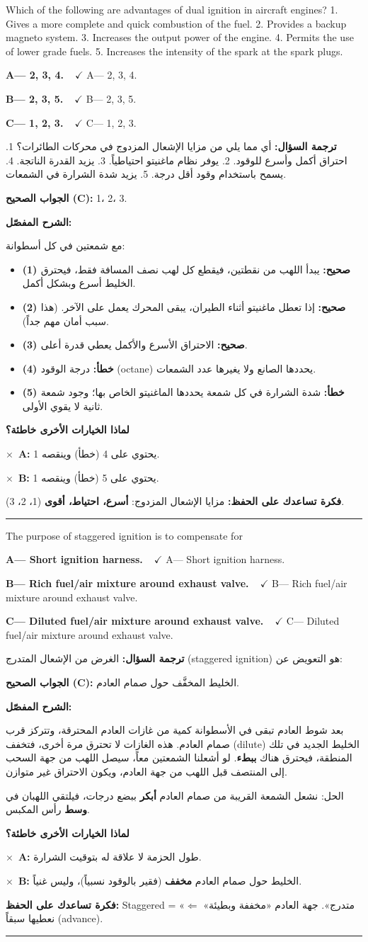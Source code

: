 \documentclass[11pt,a4paper]{article}
\newcommand{\en}[1]{\textenglish{#1}}
\newcommand{\correctletter}{}
\newcommand{\opt}[2]{%
  \ifdefstring{\correctletter}{#1}%
    {\textcolor{ansgreen}{\textbf{#1— #2\ \ $\checkmark$}}}%
    {#1— #2}\par}
\newcommand{\Q}[6]{%
  \renewcommand{\correctletter}{#6}%
  \par\bigskip
  \phantomsection\label{q#1}%
  \begin{tcolorbox}[enhanced,breakable,colback=qback,colframe=qframe,
      arc=2mm,boxrule=0.8pt,fonttitle=\bfseries,
      title={\en{Question #1}}]
    \begin{english}
      #2\par\smallskip
      \opt{A}{#3}\opt{B}{#4}\opt{C}{#5}
    \end{english}
  \end{tcolorbox}}
\newcommand{\tr}[1]{\textbf{\textcolor{qframe}{ترجمة السؤال:}} #1\par}
\newcommand{\ans}[2]{%
  \begin{tcolorbox}[colback=ansback,colframe=ansgreen,boxrule=0.6pt,arc=1.5mm,
      left=4pt,right=4pt,top=2pt,bottom=2pt]
    \textbf{\textcolor{ansgreen}{الجواب الصحيح (\en{#1}):}} #2
  \end{tcolorbox}}
\newcommand{\sharh}[1]{\textbf{\textcolor{conceptc}{الشرح المفصّل:}}\par #1\par}
\newcommand{\nohead}{\textbf{\textcolor{wrongc}{لماذا الخيارات الأخرى خاطئة؟}}\par}
\newcommand{\no}[2]{\hspace*{1em}\textcolor{wrongc}{$\times$}\ \textbf{\en{#1}:} #2\par}
\newcommand{\tip}[1]{%
  \begin{tcolorbox}[colback=tipback,colframe=tipframe,boxrule=0.5pt,arc=1.5mm,
      left=4pt,right=4pt,top=2pt,bottom=2pt]
    \textbf{فكرة تساعدك على الحفظ:} #1
  \end{tcolorbox}}
\newcommand{\qsep}{\par\medskip\noindent\textcolor{qframe!40}{\rule{\linewidth}{0.4pt}}\par}
\begin{document}
\Q{8600}{Which of the following are advantages of dual ignition in aircraft engines? 1. Gives a more complete and quick combustion of the fuel. 2. Provides a backup magneto system. 3. Increases the output power of the engine. 4. Permits the use of lower grade fuels. 5. Increases the intensity of the spark at the spark plugs.}
{2, 3, 4.}
{2, 3, 5.}
{1, 2, 3.}{C}
\tr{أي مما يلي من مزايا الإشعال المزدوج في محركات الطائرات؟ 1. احتراق أكمل وأسرع للوقود. 2. يوفر نظام ماغنيتو احتياطياً. 3. يزيد القدرة الناتجة. 4. يسمح باستخدام وقود أقل درجة. 5. يزيد شدة الشرارة في الشمعات.}
\ans{C}{1، 2، 3.}
\sharh{مع شمعتين في كل أسطوانة:
\begin{itemize}
  \item \textbf{(1) صحيح:} يبدأ اللهب من نقطتين، فيقطع كل لهب نصف المسافة فقط، فيحترق الخليط أسرع وبشكل أكمل.
  \item \textbf{(2) صحيح:} إذا تعطل ماغنيتو أثناء الطيران، يبقى المحرك يعمل على الآخر. (هذا سبب أمان مهم جداً).
  \item \textbf{(3) صحيح:} الاحتراق الأسرع والأكمل يعطي قدرة أعلى.
  \item \textbf{(4) خطأ:} درجة الوقود (\en{octane}) يحددها الصانع ولا يغيرها عدد الشمعات.
  \item \textbf{(5) خطأ:} شدة الشرارة في كل شمعة يحددها الماغنيتو الخاص بها؛ وجود شمعة ثانية لا يقوي الأولى.
\end{itemize}}
\nohead
\no{A}{يحتوي على 4 (خطأ) وينقصه 1.}
\no{B}{يحتوي على 5 (خطأ) وينقصه 1.}
\tip{مزايا الإشعال المزدوج: \textbf{أسرع، احتياط، أقوى} (1، 2، 3).}
\qsep

\Q{8532}{The purpose of staggered ignition is to compensate for}
{Short ignition harness.}
{Rich fuel/air mixture around exhaust valve.}
{Diluted fuel/air mixture around exhaust valve.}{C}
\tr{الغرض من الإشعال المتدرج (\en{staggered ignition}) هو التعويض عن:}
\ans{C}{الخليط المخفَّف حول صمام العادم.}
\sharh{بعد شوط العادم تبقى في الأسطوانة كمية من غازات العادم المحترقة، وتتركز قرب صمام العادم. هذه الغازات لا تحترق مرة أخرى، فتخفف (\en{dilute}) الخليط الجديد في تلك المنطقة، فيحترق هناك \textbf{ببطء}. لو أشعلنا الشمعتين معاً، سيصل اللهب من جهة السحب إلى المنتصف قبل اللهب من جهة العادم، ويكون الاحتراق غير متوازن.

الحل: نشعل الشمعة القريبة من صمام العادم \textbf{أبكر} ببضع درجات، فيلتقي اللهبان في \textbf{وسط} رأس المكبس.}
\nohead
\no{A}{طول الحزمة لا علاقة له بتوقيت الشرارة.}
\no{B}{الخليط حول صمام العادم \textbf{مخفف} (فقير بالوقود نسبياً)، وليس غنياً.}
\tip{\en{Staggered} = «متدرج». جهة العادم «مخففة وبطيئة» $\Leftarrow$ نعطيها سبقاً (\en{advance}).}
\qsep
\end{document}
